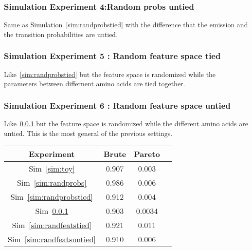 \subsubsection{Simulation Experiment 4:Random probs untied}
\label{sim:randprobsuntied}
Same as Simulation~\ref{sim:randprobstied} with the difference that the emission and the transition probabilities are untied. 

\subsubsection{Simulation Experiment 5 : Random feature space tied}
Like~\ref{sim:randprobstied} but the feature space is randomized while the parameters between differnent amino acids are tied together. 
\label{sim:randfeatstied}

\subsubsection{Simulation Experiment 6 :  Random feature space untied}
Like~\ref{sim:randprobsuntied} but the feature space is randomized while the different amino acids are untied. This is the most general of the previous settings. 
\label{sim:randfeatsuntied}


\begin{center}
    \begin{tabular}{| c | c | c | c |}
    \hline
    Experiment & Brute & Pareto \\ \hline
    Sim~\ref{sim:toy} & 0.907 & 0.003 \\ \hline
    Sim~\ref{sim:randprobs} & 0.986 & 0.006 \\ \hline
    Sim~\ref{sim:randprobstied} & 0.912 & 0.004 \\ \hline
    Sim~\ref{sim:randprobsuntied} & 0.903 & 0.0034\\ \hline
    Sim~\ref{sim:randfeatstied} & 0.921 & 0.011 \\ \hline
    Sim~\ref{sim:randfeatsuntied} & 0.910 & 0.006 \\ \hline
    \hline
    \end{tabular}
\end{center}


